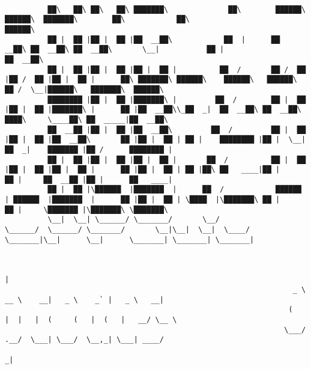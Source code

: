 \documentclass[varwidth=\maxdimen,margin=0.5cm,multi={verbatim}]{standalone}
\begin{document}
\begin{verbatim}

          ██\   ██\ ██\   ██\ ███████\              ██\        ██████\   ██████\  ███████\        ██\            ██\                          ██████\                               
          ██ |  ██ |██ |  ██ |██  __██\            ██  |      ██  __██\ ██  __██\ ██  __██\       \__|           ██ |                        ██  __██\                              
          ██ |  ██ |██ |  ██ |██ |  ██ |          ██  /       ██ /  ██ |██ /  ██ |██ |  ██ |      ██\ ███████\ ██████\    ██████\   ██████\  ██ /  \__|██████\   ███████\  ██████\  
          ████████ |██ |  ██ |███████\ |         ██  /        ██ |  ██ |██ |  ██ |███████\ |      ██ |██  __██\\_██  _|  ██  __██\ ██  __██\ ████\     \____██\ ██  _____|██  __██\ 
          ██  __██ |██ |  ██ |██  __██\         ██  /         ██ |  ██ |██ |  ██ |██  __██\       ██ |██ |  ██ | ██ |    ████████ |██ |  \__|██  _|    ███████ |██ /      ████████ |
          ██ |  ██ |██ |  ██ |██ |  ██ |       ██  /          ██ |  ██ |██ |  ██ |██ |  ██ |      ██ |██ |  ██ | ██ |██\ ██   ____|██ |      ██ |     ██  __██ |██ |      ██   ____|
          ██ |  ██ |\██████  |███████  |      ██  /            ██████  | ██████  |███████  |      ██ |██ |  ██ | \████  |\███████\ ██ |      ██ |     \███████ |\███████\ \███████\ 
          \__|  \__| \______/ \_______/       \__/             \______/  \______/ \_______/       \__|\__|  \__|  \____/  \_______|\__|      \__|      \_______| \_______| \_______|


                                                                                                 |             
                                                                   _ \   __ \    __|   _ \    _` |   _ \   __| 
                                                                  (   |  |   |  (     (   |  (   |   __/ \__ \ 
                                                                 \___/   .__/  \___| \___/  \__,_| \___| ____/ 
                                                                        _|




\end{verbatim}
\end{document}
